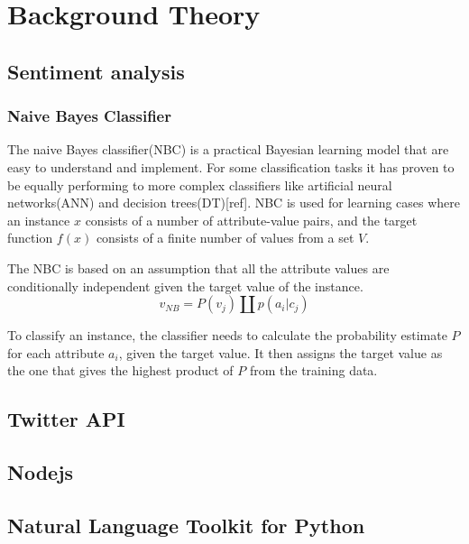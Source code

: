 \section{Background Theory}
	\subsection{Sentiment analysis}
		\subsubsection{Naive Bayes Classifier}
		The naive Bayes classifier(NBC) is a practical Bayesian learning model that are easy to understand and implement. For some classification tasks it has proven to be equally performing to more complex classifiers like artificial neural networks(ANN) and decision trees(DT)[ref]. NBC is used for learning cases where an instance $x$ consists of a number of attribute-value pairs, and the target function $f(x)$ consists of a finite number of values from a set $V$.

The NBC is based on an assumption that all the attribute values are conditionally independent given the target value of the instance.
\begin{equation}
\label{equation:nbc}
v_{NB} = P(v_j) \amalg p(a_i|c_j)
\end{equation}

To classify an instance, the classifier needs to calculate the probability estimate $P$ for each attribute $a_i$, given the target value. It then assigns the target value as the one that gives the highest product of $P$ from the training data.
	\subsection{Twitter API}
	\subsection{Nodejs}
	\subsection{Natural Language Toolkit for Python}